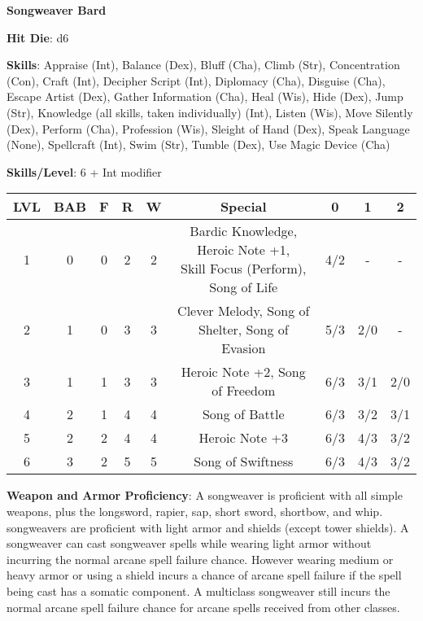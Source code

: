 \textbf{\huge{Songweaver Bard}}

\textbf{Hit Die}: d6

\textbf{Skills}: Appraise (Int), Balance (Dex), Bluff (Cha), Climb (Str), Concentration (Con), Craft (Int), Decipher Script (Int), Diplomacy (Cha), Disguise (Cha), Escape Artist (Dex), Gather Information (Cha), Heal (Wis), Hide (Dex), Jump (Str), Knowledge (all skills, taken individually) (Int), Listen (Wis), Move Silently (Dex), Perform (Cha), Profession (Wis), Sleight of Hand (Dex), Speak Language (None), Spellcraft (Int), Swim (Str), Tumble (Dex), Use Magic Device (Cha)

\textbf{Skills/Level}: 6 + Int modifier

\begin{center}
\begin{adjustwidth}{-4cm}{}
\begin{small}
\begin{tabular}{| c | c | c | c | c | c | c | c | c |}
\hline
LVL &BAB &F &R &W &Special &0 &1 &2 \\
\hline
1 &0 &0 &2 &2 &\makecell{Bardic Knowledge, Heroic Note +1,\\ Skill Focus (Perform), Song of Life} &4/2 &- &- \\
2 &1 &0 &3 &3 &Clever Melody, Song of Shelter, Song of Evasion &5/3 &2/0 &- \\
3 &1 &1 &3 &3 &Heroic Note +2, Song of Freedom &6/3 &3/1 &2/0 \\
4 &2 &1 &4 &4 &Song of Battle &6/3 &3/2 &3/1 \\
5 &2 &2 &4 &4 &Heroic Note +3 &6/3 &4/3 &3/2 \\
6 &3 &2 &5 &5 &Song of Swiftness &6/3 &4/3 &3/2 \\
\hline
\end{tabular}
\end{small}
\end{adjustwidth}
\end{center}

\textbf{Weapon and Armor Proficiency}: A songweaver is proficient with all simple weapons, plus the longsword, rapier, sap, short sword, shortbow, and whip. songweavers are proficient with light armor and shields (except tower shields). A songweaver can cast songweaver spells while wearing light armor without incurring the normal arcane spell failure chance. However wearing medium or heavy armor or using a shield incurs a chance of arcane spell failure if the spell being cast has a somatic component. A multiclass songweaver still incurs the normal arcane spell failure chance for arcane spells received from other classes.

